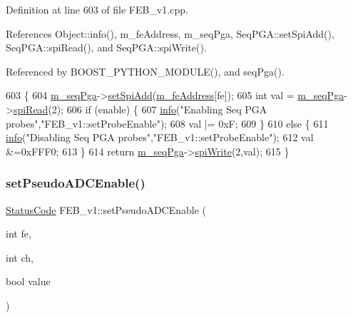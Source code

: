 Definition at line 603 of file F\+E\+B\+\_\+v1.\+cpp.



References Object\+::info(), m\+\_\+fe\+Address, m\+\_\+seq\+Pga, Seq\+P\+G\+A\+::set\+Spi\+Add(), Seq\+P\+G\+A\+::spi\+Read(), and Seq\+P\+G\+A\+::spi\+Write().



Referenced by B\+O\+O\+S\+T\+\_\+\+P\+Y\+T\+H\+O\+N\+\_\+\+M\+O\+D\+U\+L\+E(), and seq\+Pga().


\begin{DoxyCode}
603                                                      \{
604   \hyperlink{classFEB__v1_a6c7804ac86796f233a8393043adf2e77}{m\_seqPga}->\hyperlink{classSeqPGA_ac998ce3a6d9b5f2e88cc8393f8c1df53}{setSpiAdd}(\hyperlink{classFEB__v1_a4e1945c2d5b434125f375e9d0fc6d99f}{m\_feAddress}[fe]);
605   \textcolor{keywordtype}{int} val = \hyperlink{classFEB__v1_a6c7804ac86796f233a8393043adf2e77}{m\_seqPga}->\hyperlink{classSeqPGA_ab3d0e5e5d4014bc7a92588a76b8713d4}{spiRead}(2);
606   \textcolor{keywordflow}{if} (enable) \{
607     \hyperlink{classObject_a644fd329ea4cb85f54fa6846484b84a8}{info}(\textcolor{stringliteral}{"Enabling Seq PGA probes"},\textcolor{stringliteral}{"FEB\_v1::setProbeEnable"});
608     val |= 0xF;
609   \}
610   \textcolor{keywordflow}{else} \{
611     \hyperlink{classObject_a644fd329ea4cb85f54fa6846484b84a8}{info}(\textcolor{stringliteral}{"Disabling Seq PGA probes"},\textcolor{stringliteral}{"FEB\_v1::setProbeEnable"});
612     val &=0xFFF0;
613   \}
614   \textcolor{keywordflow}{return} \hyperlink{classFEB__v1_a6c7804ac86796f233a8393043adf2e77}{m\_seqPga}->\hyperlink{classSeqPGA_ad4421841ce4ce8b88ad13f63216f0743}{spiWrite}(2,val);
615 \}
\end{DoxyCode}
\mbox{\label{classFEB__v1_a244c472d16ea6778cf6ec93943a060a5}} 
\subsubsection{\texorpdfstring{set\+Pseudo\+A\+D\+C\+Enable()}{setPseudoADCEnable()}}
{\footnotesize\ttfamily \hyperlink{classStatusCode}{Status\+Code} F\+E\+B\+\_\+v1\+::set\+Pseudo\+A\+D\+C\+Enable (\begin{DoxyParamCaption}\item[{int}]{fe,  }\item[{int}]{ch,  }\item[{bool}]{value }\end{DoxyParamCaption})}




